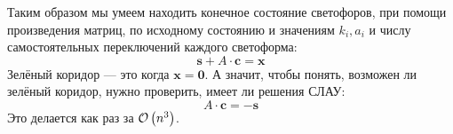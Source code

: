 \begin{solution}
Таким образом мы умеем находить конечное состояние светофоров, при помощи произведения матриц, по исходному состоянию и значениям $k_i, a_i$ и числу самостоятельных переключений каждого светоформа:
\[
	\bm{s} + A\cdot\bm{c} = \bm{x}
\]
Зелёный коридор --- это когда $\bm{x} = \bm{0}$. А значит, чтобы понять, возможен ли зелёный коридор, нужно проверить, имеет ли решения СЛАУ:
\[
	A\cdot\bm{c} = -\bm{s}
\]
Это делается как раз за $\mathcal{O}\left(n^3\right)$. \xqed
\end{solution}


